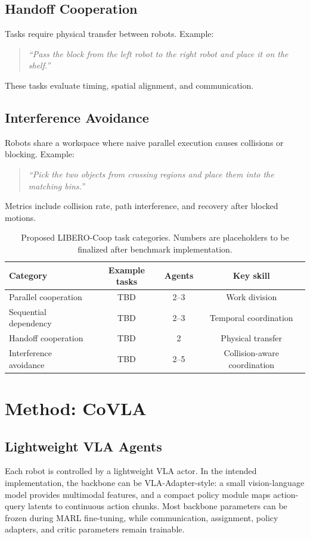 \documentclass[11pt]{article}
\newcommand{\method}{CoVLA}
\newcommand{\liberocoop}{LIBERO-Coop}
\begin{document}
\subsection{Handoff Cooperation}
Tasks require physical transfer between robots. Example:
\begin{quote}
\emph{``Pass the block from the left robot to the right robot and place it on the shelf.''}
\end{quote}
These tasks evaluate timing, spatial alignment, and communication.

\subsection{Interference Avoidance}
Robots share a workspace where naive parallel execution causes collisions or blocking. Example:
\begin{quote}
\emph{``Pick the two objects from crossing regions and place them into the matching bins.''}
\end{quote}
Metrics include collision rate, path interference, and recovery after blocked motions.

\begin{table}[t]
\centering
\caption{Proposed \liberocoop{} task categories. Numbers are placeholders to be finalized after benchmark implementation.}
\label{tab:benchmark}
\begin{tabular}{lccc}
\toprule
Category & Example tasks & Agents & Key skill \\
\midrule
Parallel cooperation & TBD & 2--3 & Work division \\
Sequential dependency & TBD & 2--3 & Temporal coordination \\
Handoff cooperation & TBD & 2 & Physical transfer \\
Interference avoidance & TBD & 2--5 & Collision-aware coordination \\
\bottomrule
\end{tabular}
\end{table}

\section{Method: \method{}}

\subsection{Lightweight VLA Agents}
Each robot is controlled by a lightweight VLA actor. In the intended implementation, the backbone can be VLA-Adapter-style: a small vision-language model provides multimodal features, and a compact policy module maps action-query latents to continuous action chunks. Most backbone parameters can be frozen during MARL fine-tuning, while communication, assignment, policy adapters, and critic parameters remain trainable.
\end{document}

